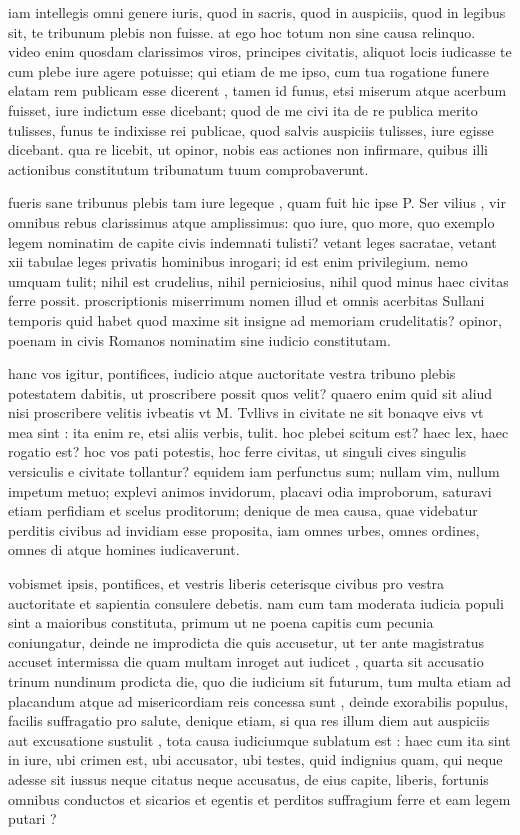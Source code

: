  iam intellegis omni genere iuris, quod in sacris, quod in auspiciis, quod in legibus sit, te tribunum plebis non fuisse. at ego hoc totum non sine causa relinquo. video enim quosdam clarissimos viros, principes civitatis, aliquot locis iudicasse te cum plebe iure agere potuisse; qui etiam de me ipso, cum tua rogatione funere elatam rem publicam esse dicerent , tamen id funus, etsi miserum atque acerbum fuisset, iure indictum esse dicebant; quod de me civi ita de re publica merito tulisses, funus te indixisse rei publicae, quod salvis auspiciis tulisses, iure egisse dicebant. qua re licebit, ut opinor, nobis eas actiones non infirmare, quibus illi actionibus constitutum tribunatum tuum comprobaverunt.

 fueris sane tribunus plebis tam iure legeque , quam fuit hic ipse P. Ser vilius , vir omnibus rebus clarissimus atque amplissimus: quo iure, quo more, quo exemplo legem nominatim de capite civis indemnati tulisti? vetant leges sacratae, vetant xii tabulae leges privatis hominibus inrogari; id est enim privilegium. nemo umquam tulit; nihil est crudelius, nihil perniciosius, nihil quod minus haec civitas ferre possit. proscriptionis miserrimum nomen illud et omnis acerbitas Sullani temporis quid habet quod maxime sit insigne ad memoriam crudelitatis? opinor, poenam in civis Romanos nominatim sine iudicio constitutam.

 hanc vos igitur, pontifices, iudicio atque auctoritate vestra tribuno plebis potestatem dabitis, ut proscribere possit quos velit? quaero enim quid sit aliud nisi proscribere velitis ivbeatis vt M. Tvllivs in civitate ne sit bonaqve eivs vt mea sint : ita enim re, etsi aliis verbis, tulit. hoc plebei scitum est? haec lex, haec rogatio est? hoc vos pati potestis, hoc ferre civitas, ut singuli cives singulis versiculis e civitate tollantur? equidem iam perfunctus sum; nullam vim, nullum impetum metuo; explevi animos invidorum, placavi odia improborum, saturavi etiam perfidiam et scelus proditorum; denique de mea causa, quae videbatur perditis civibus ad invidiam esse proposita, iam omnes urbes, omnes ordines, omnes di atque homines iudicaverunt.

 vobismet ipsis, pontifices, et vestris liberis ceterisque civibus pro vestra auctoritate et sapientia consulere debetis. nam cum tam moderata iudicia populi sint a maioribus constituta, primum ut ne poena capitis cum pecunia coniungatur, deinde ne improdicta die quis accusetur, ut ter ante magistratus accuset intermissa die quam multam inroget aut iudicet , quarta sit accusatio trinum nundinum prodicta die, quo die iudicium sit futurum, tum multa etiam ad placandum atque ad misericordiam reis concessa sunt , deinde exorabilis populus, facilis suffragatio pro salute, denique etiam, si qua res illum diem aut auspiciis aut excusatione sustulit , tota causa iudiciumque sublatum est : haec cum ita sint in iure, ubi crimen est, ubi accusator, ubi testes, quid indignius quam, qui neque adesse sit iussus neque citatus neque accusatus, de eius capite, liberis, fortunis omnibus conductos et sicarios et egentis et perditos suffragium ferre et eam legem putari ?

